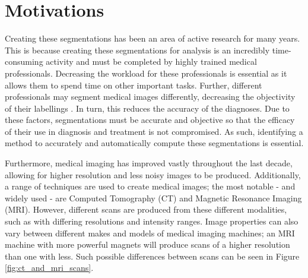 \documentclass{l4proj}
\begin{document}
\section{Motivations} \label{sec:motivations}

Creating these segmentations has been an area of active research for many years. This is because creating these segmentations for analysis is an incredibly time-consuming activity and must be completed by highly trained medical professionals. Decreasing the workload for these professionals is essential as it allows them to spend time on other important tasks. Further, different professionals may segment medical images differently, decreasing the objectivity of their labellings \citep{patil2013medical}. In turn, this reduces the accuracy of the diagnoses. Due to these factors, segmentations must be accurate and objective so that the efficacy of their use in diagnosis and treatment is not compromised. As such, identifying a method to accurately and automatically compute these segmentations is essential.

Furthermore, medical imaging has improved vastly throughout the last decade, allowing for higher resolution and less noisy images to be produced. Additionally, a range of techniques are used to create medical images; the most notable - and widely used - are Computed Tomography (CT) and Magnetic Resonance Imaging (MRI). However, different scans are produced from these different modalities, such as with differing resolutions and intensity ranges. Image properties can also vary between different makes and models of medical imaging machines; an MRI machine with more powerful magnets will produce scans of a higher resolution than one with less. Such possible differences between scans can be seen in Figure \ref{fig:ct_and_mri_scans}.
\end{document}
